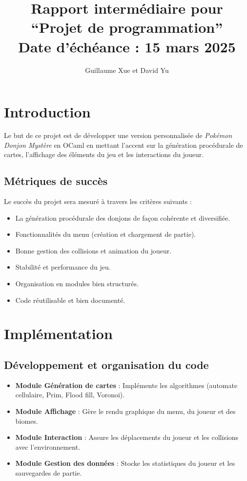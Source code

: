 \documentclass{article}
\title{
  Rapport intermédiaire pour \\
  ``Projet de programmation''\\
  Date d'échéance : 15 mars 2025
}
\author{Guillaume Xue et David Yu}
\begin{document}
\maketitle


\section{Introduction}
Le but de ce projet est de développer une version personnalisée 
de \textit{Pokémon Donjon Mystère} en OCaml en mettant l'accent 
sur la génération procédurale de cartes, l'affichage des éléments 
du jeu et les interactions du joueur.

\subsection{Métriques de succès}
Le succès du projet sera mesuré à travers les critères suivants :
\begin{itemize}
    \item La génération procédurale des donjons 
    de façon cohérente et diversifiée.
    \item Fonctionnalités du menu (création et chargement de partie).
    \item Bonne gestion des collisions et animation du joueur.
    \item Stabilité et performance du jeu.
    \item Organisation en modules bien structurés.
    \item Code réutilisable et bien documenté.
\end{itemize}

\section{Implémentation}

\subsection{Développement et organisation du code}
\begin{itemize}
  \item \textbf{Module Génération de cartes} : Implémente les algorithmes (automate cellulaire, Prim, Flood fill, Voronoi).
  \item \textbf{Module Affichage} : Gère le rendu graphique du menu, du joueur et des biomes.
  \item \textbf{Module Interaction} : Assure les déplacements du joueur et les collisions avec l’environnement.
  \item \textbf{Module Gestion des données} : Stocke les statistiques du joueur et les sauvegardes de partie.
\end{itemize}
\end{document}
